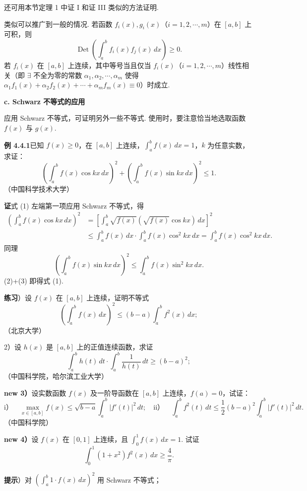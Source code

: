 \documentclass[UTF8, 12pt, fontset=fandol, oneside]{ctexart}
\begin{document}
还可用本节定理 1 中证 I 和证 III 类似的方法证明.

类似可以推广到一般的情况. 若函数 $f_i(x),g_i(x)$（$i=1,2,\cdots,m$）在 $[a,b]$ 上可积，则
\[
\operatorname{Det}\left(\int_a^b f_i(x)f_j(x)\,dx\right)\ge0.
\]
若 $f_i(x)$ 在 $[a,b]$ 上连续，其中等号当且仅当 $f_i(x)$（$i=1,2,\cdots,m$）线性相关（即 $\exists$ 不全为零的常数
$\alpha_1,\alpha_2,\cdots,\alpha_m$ 使得
$\alpha_1f_1(x)+\alpha_2f_2(x)+\cdots+\alpha_mf_m(x)\equiv0$）时成立.

\noindent\textbf{c. Schwarz 不等式的应用}

应用 Schwarz 不等式，可证明另外一些不等式. 使用时，要注意恰当地选取函数 $f(x)$ 与 $g(x)$.

\noindent\textbf{例 4.4.1}\quad 已知 $f(x)\ge0$，在 $[a,b]$ 上连续，$\displaystyle\int_a^b f(x)\,dx=1$，$k$ 为任意实数，求证：
\[
\left(\int_a^b f(x)\cos kx\,dx\right)^2+
\left(\int_a^b f(x)\sin kx\,dx\right)^2\le1. \tag{1}
\]
（中国科学技术大学）

\noindent\textbf{证}\quad 式 (1) 左端第一项应用 Schwarz 不等式，得
\begin{equation}
\begin{aligned}
\left(\int_a^b f(x)\cos kx\,dx\right)^2
&=\left[\int_a^b \sqrt{f(x)}(\sqrt{f(x)}\cos kx)\,dx\right]^2\\
&\le \int_a^b f(x)\,dx\cdot\int_a^b f(x)\cos^2kx\,dx
=\int_a^b f(x)\cos^2kx\,dx.
\end{aligned}
\tag{2}
\end{equation}
同理
\[
\left(\int_a^b f(x)\sin kx\,dx\right)^2
\le\int_a^b f(x)\sin^2kx\,dx. \tag{3}
\]
(2)+(3) 即得式 (1).

\noindent\textbf{练习}）设 $f(x)$ 在 $[a,b]$ 上连续，证明不等式
\[
\left(\int_a^b f(x)\,dx\right)^2\le(b-a)\int_a^b f^2(x)\,dx;
\]
（北京大学）

2）设 $h(x)$ 是 $[a,b]$ 上的正值连续函数，求证
\[
\int_a^b h(t)\,dt\cdot\int_a^b\frac1{h(t)}\,dt\ge(b-a)^2;
\]
（中国科学院，哈尔滨工业大学）

\noindent\textbf{new 3）}\quad 设实数函数 $f(x)$ 及一阶导函数在 $[a,b]$ 上连续，$f(a)=0$，试证：
\[
\text{i）}\quad
\max_{x\in[a,b]}f(x)\le\sqrt{b-a}\int_a^b |f'(t)|^2\,dt;
\quad
\text{ii）}\quad
\int_a^b f^2(t)\,dt\le\frac12(b-a)^2\int_a^b |f'(t)|^2\,dt.
\]
（中国科学院）

\noindent\textbf{new 4）}\quad 设 $f(x)$ 在 $[0,1]$ 上连续，且 $\displaystyle\int_0^1 f(x)\,dx=1$. 试证
\[
\int_0^1(1+x^2)f^2(x)\,dx\ge\frac4\pi.
\]

\noindent\textbf{提示}）对 $\left(\displaystyle\int_a^b 1\cdot f(x)\,dx\right)^2$ 用 Schwarz 不等式；
\end{document}
